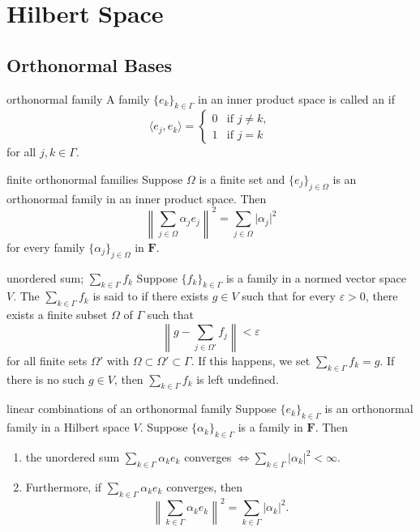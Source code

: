 \documentclass[../main.tex]{subfiles}
\begin{document}
\ifSubfilesClassLoaded{

    
}{}

\chapter{ Hilbert Space }

\section{Orthonormal Bases}
\begin{definition}{orthonormal family}{}
A family $\{e_k\}_{k\in\Gamma}$ in an inner product space is called an  if
\[
\langle e_j, e_k\rangle = \begin{cases}
0 & \text{if } j \neq k, \\
1 & \text{if } j = k
\end{cases}
\]
for all $j, k \in \Gamma$.
\end{definition}

\begin{proposition}{finite orthonormal families}{}
Suppose \(\Omega\) is a finite set and \(\{e_j\}_{j\in\Omega}\) is an orthonormal family in an inner product space. Then
\[
\left\lVert \sum_{j\in\Omega} \alpha_j e_j \right\rVert^2 = \sum_{j\in\Omega} \lvert \alpha_j \rvert^2
\]
for every family \(\{\alpha_j\}_{j\in\Omega}\) in \(\mathbf{F}\).
\end{proposition}

\begin{definition}{unordered sum; \(\sum_{k\in\Gamma} f_k\)}{}
Suppose \(\{f_k\}_{k\in\Gamma}\) is a family in a normed vector space \(V\). The  \(\sum_{k\in\Gamma} f_k\) is said to  if there exists \(g\in V\) such that for every \(\varepsilon>0\), there exists a finite subset \(\Omega\) of \(\Gamma\) such that
\[
\left\lVert g-\sum_{j\in\Omega'}f_j\right\rVert<\varepsilon
\]
for all finite sets \(\Omega'\) with \(\Omega\subset\Omega'\subset\Gamma\). If this happens, we set \(\sum_{k\in\Gamma} f_k=g\). If there is no such \(g\in V\), then \(\sum_{k\in\Gamma} f_k\) is left undefined.
\end{definition}

\begin{theorem}{linear combinations of an orthonormal family}{}
Suppose $\{e_k\}_{k \in \Gamma}$ is an orthonormal family in a Hilbert space $V$. Suppose $\{\alpha_k\}_{k \in \Gamma}$ is a family in $\mathbf{F}$. Then
\begin{enumerate}
    \item[(a)] the unordered sum $\displaystyle \sum_{k \in \Gamma} \alpha_k e_k$ converges $\iff \displaystyle \sum_{k \in \Gamma} |\alpha_k|^2 < \infty$.
    \item[(b)] Furthermore, if $\sum_{k \in \Gamma} \alpha_k e_k$ converges, then\[\left\| \sum_{k \in \Gamma} \alpha_k e_k \right\|^2 = \sum_{k \in \Gamma} |\alpha_k|^2.\]
\end{enumerate}
\end{theorem}
\end{document}
